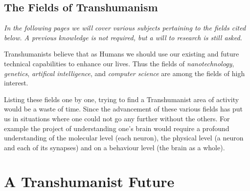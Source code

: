 \documentclass[
      12pt,
      a4paper,
      cleardoublepage=empty,
      final,
      twoside
        ]{scrbook}
\begin{document}
    \subsection{The Fields of Transhumanism}
      \begin{par}
       \emph{ In the following pages we will cover various subjects pertaining to the fields cited below. A previous knowledge is not required, but a will to research is still asked.} \\
      \end{par}
      \begin{par}
        Transhumanists believe that as Humans we should use our existing and future technical capabilities to enhance our lives. 
        Thus the fields of \emph{nanotechnology}, \emph{genetics}, \emph{artifical intelligence}, and \emph{computer science} are among the fields of high interest.
      \end{par}
      \begin{par}
        Listing these fields one by one, trying to find a Transhumanist area of activity would be a waste of time. Since the advancement of these various fields has put us in situations where one could not go any further without the others. For example the project of understanding one's brain would require a profound understanding of the molecular level (each neuron), the physical level (a neuron and each of its synapses) and on a behaviour level (the brain as a whole). 
      \end{par}

  \section{A Transhumanist Future}
\end{document}
